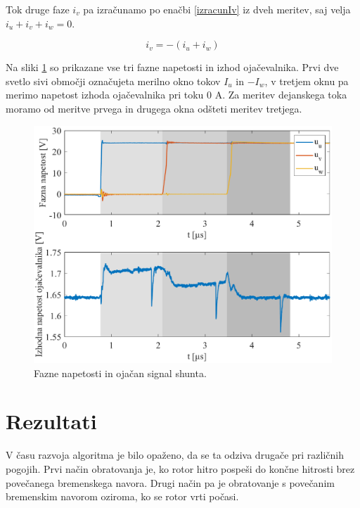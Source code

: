 \documentclass[a4paper,twoside,openright,12pt,slovene]{book}
\begin{document}
Tok druge faze $i_v$ pa izračunamo po enačbi \ref{izracunIv} iz dveh meritev, saj velja $i_u + i_v + i_w = 0$.

\begin{equation} \label{izracunIv}
i_v = -(i_u + i_w)
\end{equation}

Na sliki \ref{fazeInShunt} so prikazane vse tri fazne napetosti in izhod ojačevalnika. Prvi dve svetlo sivi območji označujeta merilno okno tokov $I_u$ in $- I_w$, v tretjem oknu pa merimo napetost
izhoda ojačevalnika pri toku 0 A. Za meritev dejanskega toka moramo od meritve prvega in drugega okna odšteti meritev tretjega.

\begin{figure}[!htbp]
    \centering
    \includegraphics[width=1\columnwidth]{Slike/fazeInShunt.eps}
    \caption{\label{fazeInShunt} Fazne napetosti in ojačan signal shunta. }
\end{figure}

\newpage
\section{Rezultati} \label{rezultati}

V času razvoja algoritma je bilo opaženo, da se ta odziva drugače pri različnih pogojih. Prvi način obratovanja je, ko rotor hitro pospeši do končne hitrosti brez povečanega bremenskega navora. Drugi
način pa je obratovanje s povečanim bremenskim navorom oziroma, ko se rotor vrti počasi. 
\end{document}
